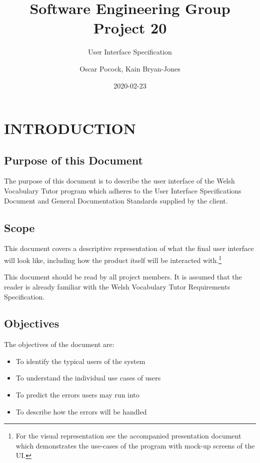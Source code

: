 \documentclass{project}
\begin{document}
\title{Software Engineering Group Project 20}
\subtitle{User Interface Specification}
\author{Oscar Pocock, Kain Bryan-Jones}     
\date{2020-02-23}
\maketitle
\tableofcontents
\newpage
\section{INTRODUCTION}
\subsection{Purpose of this Document}
The purpose of this document is to describe the user interface of the Welsh Vocabulary Tutor program which adheres to the User Interface Specifications Document\cite{se.qa.04} and General Documentation Standards\cite{se.qa.02} supplied by the client.

\subsection{Scope}
This document covers a descriptive representation of what the final user interface will look like, including how the product itself will be interacted with.\footnote{For the visual representation see the accompanied presentation document which demonstrates the use-cases of the program with mock-up screens of the UI.}

This document should be read by all project members. It is assumed that the reader is already familiar with the Welsh Vocabulary Tutor Requirements Specification\cite{se.qa.csrs}.
\subsection{Objectives}
The objectives of the document are:
\begin{itemize}
	\item To identify the typical users of the system
	\item To understand the individual use cases of users
	\item To predict the errors users may run into
	\item To describe how the errors will be handled
\end{itemize}
\end{document}
